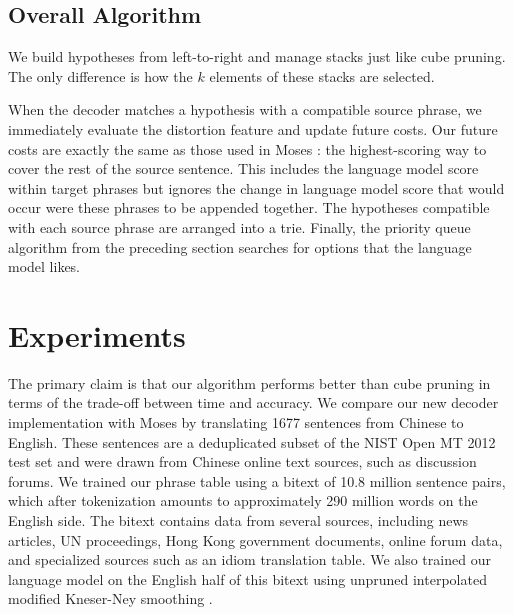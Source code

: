 \documentclass[11pt]{article}
\begin{document}
\subsection{Overall Algorithm}
We build hypotheses from left-to-right and manage stacks just like cube pruning. The only difference is how the $k$ elements of these stacks are selected.  

When the decoder matches a hypothesis with a compatible source phrase, we immediately evaluate the distortion feature and update future costs.  Our future costs are exactly the same as those used in Moses \cite{moses}: the highest-scoring way to cover the rest of the source sentence.  This includes the language model score within target phrases but ignores the change in language model score that would occur were these phrases to be appended together.  The hypotheses compatible with each source phrase are arranged into a trie.  Finally, the priority queue algorithm from the preceding section searches for options that the language model likes.    

\section{Experiments}
The primary claim is that our algorithm performs better than cube pruning in terms of the trade-off between time and accuracy.  We compare our new decoder implementation with Moses \cite{moses} by translating 1677 sentences from Chinese to English.  These sentences are a deduplicated subset of the NIST Open MT 2012 test set and were drawn from Chinese online text sources, such as discussion forums.  We trained our phrase table using a bitext of 10.8 million sentence pairs, which after tokenization amounts to approximately 290 million words on the English side. The bitext contains data from several sources, including news articles, UN proceedings, Hong Kong government documents, online forum data, and specialized sources such as an idiom translation table. We also trained our language model on the English half of this bitext using unpruned interpolated modified Kneser-Ney smoothing \cite{kn,kn-modified}. 

\end{document}
